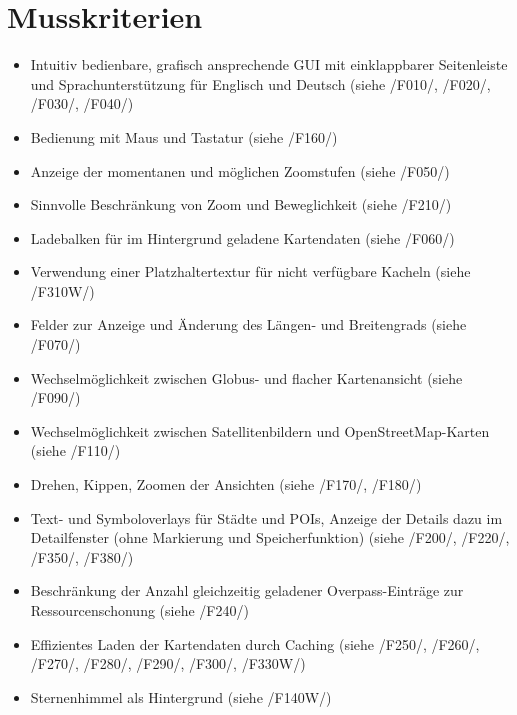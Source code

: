 \documentclass[10pt]{scrreprt}
\newcommand{\ziel}[1]{{\fontsize{9.5}{11}\textsf{/#1/}}}
\begin{document}
\section{Musskriterien}
\begin{itemize}
\item Intuitiv bedienbare, grafisch ansprechende GUI mit einklappbarer Seitenleiste und Sprachunterstützung für Englisch und Deutsch (siehe \ziel{F010}, \ziel{F020}, \ziel{F030}, \ziel{F040})
\item Bedienung mit Maus und Tastatur (siehe \ziel{F160})
\item Anzeige der momentanen und möglichen Zoomstufen (siehe \ziel{F050})
\item Sinnvolle Beschränkung von Zoom und Beweglichkeit (siehe \ziel{F210})
\item Ladebalken für im Hintergrund geladene Kartendaten (siehe \ziel{F060})
\item Verwendung einer Platzhaltertextur für nicht verfügbare Kacheln (siehe \ziel{F310W})
\item Felder zur Anzeige und Änderung des Längen- und Breitengrads (siehe \ziel{F070})
\item Wechselmöglichkeit zwischen Globus- und flacher Kartenansicht (siehe \ziel{F090})
\item Wechselmöglichkeit zwischen Satellitenbildern und OpenStreetMap-Karten (siehe \ziel{F110})
\item Drehen, Kippen, Zoomen der Ansichten (siehe \ziel{F170}, \ziel{F180})
\item Text- und Symboloverlays für Städte und POIs, Anzeige der Details dazu im Detailfenster (ohne Markierung und Speicherfunktion) (siehe \ziel{F200}, \ziel{F220}, \ziel{F350}, \ziel{F380})
\item Beschränkung der Anzahl gleichzeitig geladener Overpass-Einträge zur Ressourcenschonung (siehe \ziel{F240})
\item Effizientes Laden der Kartendaten durch Caching (siehe \ziel{F250}, \ziel{F260}, \ziel{F270}, \ziel{F280}, \ziel{F290}, \ziel{F300}, \ziel{F330W})
\item Sternenhimmel als Hintergrund (siehe \ziel{F140W})
\end{itemize}
\end{document}
